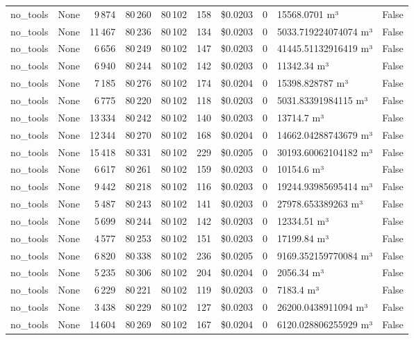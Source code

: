 \documentclass[a4paper,11pt]{article}
\begin{document}
\begin{table}[H]
{\begin{tabular}{l r r r r r r r l r}
no\_tools & None & 9\,874 & 80\,260 & 80\,102 & 158 & \$0.0203 & 0 & 15568.0701 m³ & False \\
no\_tools & None & 11\,467 & 80\,236 & 80\,102 & 134 & \$0.0203 & 0 & 5033.719224074074 m³ & False \\
no\_tools & None & 6\,656 & 80\,249 & 80\,102 & 147 & \$0.0203 & 0 & 41445.51132916419 m³ & False \\
no\_tools & None & 6\,940 & 80\,244 & 80\,102 & 142 & \$0.0203 & 0 & 11342.34 m³ & False \\
no\_tools & None & 7\,185 & 80\,276 & 80\,102 & 174 & \$0.0204 & 0 & 15398.828787 m³ & False \\
no\_tools & None & 6\,775 & 80\,220 & 80\,102 & 118 & \$0.0203 & 0 & 5031.83391984115 m³ & False \\
no\_tools & None & 13\,334 & 80\,242 & 80\,102 & 140 & \$0.0203 & 0 & 13714.7 m³ & False \\
no\_tools & None & 12\,344 & 80\,270 & 80\,102 & 168 & \$0.0204 & 0 & 14662.04288743679 m³ & False \\
no\_tools & None & 15\,418 & 80\,331 & 80\,102 & 229 & \$0.0205 & 0 & 30193.60062104182 m³ & False \\
no\_tools & None & 6\,617 & 80\,261 & 80\,102 & 159 & \$0.0203 & 0 & 10154.6 m³ & False \\
no\_tools & None & 9\,442 & 80\,218 & 80\,102 & 116 & \$0.0203 & 0 & 19244.93985695414 m³ & False \\
no\_tools & None & 5\,487 & 80\,243 & 80\,102 & 141 & \$0.0203 & 0 & 27978.653389263 m³ & False \\
no\_tools & None & 5\,699 & 80\,244 & 80\,102 & 142 & \$0.0203 & 0 & 12334.51 m³ & False \\
no\_tools & None & 4\,577 & 80\,253 & 80\,102 & 151 & \$0.0203 & 0 & 17199.84 m³ & False \\
no\_tools & None & 6\,820 & 80\,338 & 80\,102 & 236 & \$0.0205 & 0 & 9169.352159770084 m³ & False \\
no\_tools & None & 5\,235 & 80\,306 & 80\,102 & 204 & \$0.0204 & 0 & 2056.34 m³ & False \\
no\_tools & None & 6\,229 & 80\,221 & 80\,102 & 119 & \$0.0203 & 0 & 7183.4 m³ & False \\
no\_tools & None & 3\,438 & 80\,229 & 80\,102 & 127 & \$0.0203 & 0 & 26200.0438911094 m³ & False \\
no\_tools & None & 14\,604 & 80\,269 & 80\,102 & 167 & \$0.0204 & 0 & 6120.028806255929 m³ & False \\

\end{tabular}}
\end{table}
\end{document}
